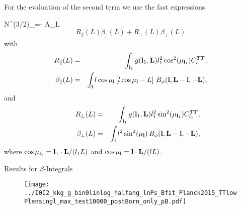 \documentclass[prd,superscriptaddress,nofootinbib,floatfix,notitlepage]{revtex4-1}
\begin{document}
For the evaluation of the second term we use the fast expressions

\beq
N^{(3/2)}_{}=- A_L \[R_{\parallel}(L) \beta_{\parallel}(L)+R_{\perp}(L) \beta_{\perp}(L)\]
\eeq
with
\begin{eqnarray}
  \label{eq:Rparallel}
R_\parallel(L) &=& \int_{{\bf l}_1}g({\bf l}_1,{\bf L})  l_1^2\cos^2(\mu_{{\bf l}_1}) C_{l_1}^{TT}, \\
\label{eq:betaparallel}
  \beta_\parallel(L) &=& \int_{{\bf l}}  l\cos\mu_{\bf l}\left[ l\cos\mu_{\bf l} - L \right] \,B_\phi({\bf l},{\bf L}-{\bf l},-{\bf L}),
\end{eqnarray}
and
\begin{eqnarray}
\label{eq:Rperp}
\qquad
R_\perp(L) &=& \int_{{\bf l}_1}g({\bf l}_1,{\bf L})  l_1^2 \sin^2(\mu_{{\bf l}_1}) C^{TT}_{l_1},\\
  \label{eq:betaperp}
  \beta_\perp(L) &=& \int_{\bf l}  l^2 \sin^2(\mu_{\bf l}) \,B_\phi({\bf l},{\bf L}-{\bf l},-{\bf L}),
\end{eqnarray}
where $\cos\mu_{{\bf l}_1}={\bf l}_1\cdot{\bf L}/(l_1L)$ and $\cos\mu_{\bf l}={\bf l}\cdot{\bf L}/(lL)$.


Results for $\beta$-Integrals
\begin{figure}[tp]
\begin{center}
\texttt{[image: ../I0I2\_kkg\_g\_bin0linlog\_halfang\_lnPs\_Bfit\_Planck2015\_TTlowPlensingl\_max\_test10000\_postBorn\_only\_pB.pdf]}
\caption{\label{fig:1}  }
\end{center}
\end{figure}



\end{document}

